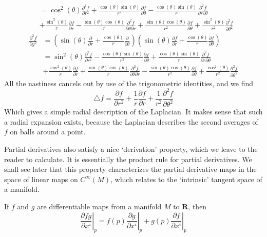 \begin{example}
\begin{align*}
        &= \cos^2(\theta) \frac{\partial^2 f}{\partial r^2} + \frac{\cos(\theta) \sin(\theta)}{r^2} \frac{\partial f}{\partial \theta} - \frac{\cos(\theta) \sin(\theta)}{r} \frac{\partial^2 f}{\partial r \partial \theta}\\
        &+ \frac{\sin^2(\theta)}{r} \frac{\partial f}{\partial r} - \frac{\sin(\theta) \cos(\theta)}{r} \frac{\partial^2 f}{\partial \theta \partial r} + \frac{\sin(\theta) \cos(\theta)}{r^2} \frac{\partial f}{\partial \theta} + \frac{\sin^2(\theta)}{r^2} \frac{\partial^2 f}{\partial \theta^2}
    \end{align*}
    \begin{align*}
        \frac{\partial^2 f}{\partial y^2} &= \left( \sin(\theta) \frac{\partial}{\partial r} + \frac{\cos(\theta)}{r} \frac{\partial}{\partial \theta} \right) \left( \sin(\theta) \frac{\partial f}{\partial r} + \frac{\cos(\theta)}{r} \frac{\partial f}{\partial \theta} \right)\\
        &= \sin^2(\theta) \frac{\partial^2 f}{\partial r^2} - \frac{\cos(\theta) \sin(\theta)}{r^2} \frac{\partial f}{\partial \theta} + \frac{\cos(\theta) \sin(\theta)}{r} \frac{\partial^2 f}{\partial r \partial \theta}\\
        &+ \frac{\cos^2(\theta)}{r} \frac{\partial f}{\partial r} + \frac{\sin(\theta) \cos(\theta)}{r} \frac{\partial^2 f}{\partial \theta \partial r} - \frac{\sin(\theta) \cos(\theta)}{r^2} \frac{\partial f}{\partial \theta} + \frac{\cos^2(\theta)}{r^2} \frac{\partial^2 f}{\partial \theta^2}
    \end{align*}
    All the nastiness cancels out by use of the trigonometric identities, and we find
    \[ \bigtriangleup f = \frac{\partial f}{\partial r^2} + \frac{1}{r} \frac{\partial f}{\partial r} + \frac{1}{r^2} \frac{\partial^2 f}{\partial \theta^2} \]
    Which gives a simple radial description of the Laplacian. It makes sense that such a radial expansion exists, because the Laplacian describes the second averages of $f$ on balls around a point.
\end{example}

Partial derivatives also satisfy a nice `derivation' property, which we leave to the reader to calculate. It is essentially the product rule for partial derivatives. We shall see later that this property characterizes the partial derivative maps in the space of linear maps on $C^\infty(M)$, which relates to the `intrinsic' tangent space of a manifold.

\begin{lemma}
    If $f$ and $g$ are differentiable maps from a manifold $M$ to $\mathbf{R}$, then
    \[ \left.\frac{\partial fg}{\partial x^i}\right|_p = f(p)\left.\frac{\partial g}{\partial x^i}\right|_p + g(p)\left.\frac{\partial f}{\partial x^i}\right|_p  \]
\end{lemma}

